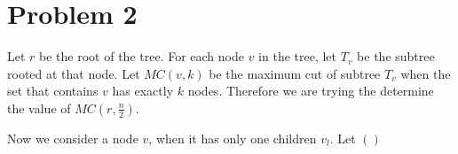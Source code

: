\documentclass{article}
\begin{document}
\section*{Problem 2}
Let $r$ be the root of the tree. For each node $v$ in the tree, let $T_v$ be the subtree rooted at 
that node. Let $MC(v, k)$ be the maximum cut of subtree $T_v$ when the set that contains $v$ has
exactly $k$ nodes. Therefore we are trying the determine the value of $MC(r, \frac{n}{2})$.

Now we consider a node $v$, when it has only one children $v_l$. Let $()$



\end{document}
